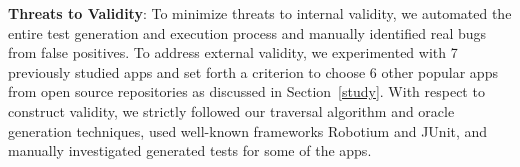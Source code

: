 

{\bf Threats to Validity}: To minimize threats to internal validity, we automated the entire test generation and execution process and manually identified real bugs from false positives. To address external validity, we experimented with 7 previously studied apps and set forth a criterion to choose 6 other popular apps from open source repositories as discussed in Section~\ref{study}. With respect to construct validity, we strictly followed our traversal algorithm and oracle generation techniques, used well-known frameworks Robotium and JUnit, and manually investigated generated tests for some of the apps. 

